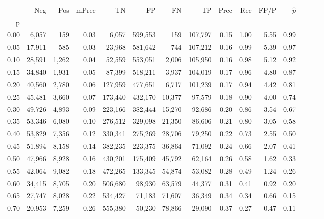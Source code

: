 \begin{tabular}{rrrrrrrrrrrrrrr}
\toprule
{} &     Neg &    Pos & mPrec &       TN &       FP &       FN &       TP &  Prec &   Rec &  FP/P & $\hat{p}$ \\
p    &         &        &       &          &          &          &          &       &       &       &           \\
\midrule
0.00 &   6,057 &    159 &  0.03 &    6,057 &  599,553 &      159 &  107,797 &  0.15 &  1.00 &  5.55 &      0.99 \\
0.05 &  17,911 &    585 &  0.03 &   23,968 &  581,642 &      744 &  107,212 &  0.16 &  0.99 &  5.39 &      0.97 \\
0.10 &  28,591 &  1,262 &  0.04 &   52,559 &  553,051 &    2,006 &  105,950 &  0.16 &  0.98 &  5.12 &      0.92 \\
0.15 &  34,840 &  1,931 &  0.05 &   87,399 &  518,211 &    3,937 &  104,019 &  0.17 &  0.96 &  4.80 &      0.87 \\
0.20 &  40,560 &  2,780 &  0.06 &  127,959 &  477,651 &    6,717 &  101,239 &  0.17 &  0.94 &  4.42 &      0.81 \\
0.25 &  45,481 &  3,660 &  0.07 &  173,440 &  432,170 &   10,377 &   97,579 &  0.18 &  0.90 &  4.00 &      0.74 \\
0.30 &  49,726 &  4,893 &  0.09 &  223,166 &  382,444 &   15,270 &   92,686 &  0.20 &  0.86 &  3.54 &      0.67 \\
0.35 &  53,346 &  6,080 &  0.10 &  276,512 &  329,098 &   21,350 &   86,606 &  0.21 &  0.80 &  3.05 &      0.58 \\
0.40 &  53,829 &  7,356 &  0.12 &  330,341 &  275,269 &   28,706 &   79,250 &  0.22 &  0.73 &  2.55 &      0.50 \\
0.45 &  51,894 &  8,158 &  0.14 &  382,235 &  223,375 &   36,864 &   71,092 &  0.24 &  0.66 &  2.07 &      0.41 \\
0.50 &  47,966 &  8,928 &  0.16 &  430,201 &  175,409 &   45,792 &   62,164 &  0.26 &  0.58 &  1.62 &      0.33 \\
0.55 &  42,064 &  9,082 &  0.18 &  472,265 &  133,345 &   54,874 &   53,082 &  0.28 &  0.49 &  1.24 &      0.26 \\
0.60 &  34,415 &  8,705 &  0.20 &  506,680 &   98,930 &   63,579 &   44,377 &  0.31 &  0.41 &  0.92 &      0.20 \\
0.65 &  27,747 &  8,028 &  0.22 &  534,427 &   71,183 &   71,607 &   36,349 &  0.34 &  0.34 &  0.66 &      0.15 \\
0.70 &  20,953 &  7,259 &  0.26 &  555,380 &   50,230 &   78,866 &   29,090 &  0.37 &  0.27 &  0.47 &      0.11 \\

\end{tabular}
